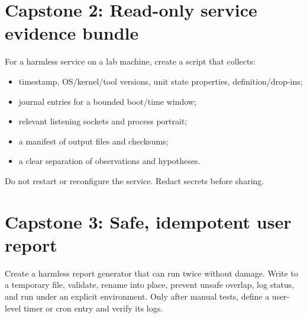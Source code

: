 \documentclass[11pt,oneside,openany]{book}
\begin{document}
\section{Capstone 2: Read-only service evidence bundle}
For a harmless service on a lab machine, create a script that collects:
\begin{itemize}
  \item timestamp, OS/kernel/tool versions, unit state properties, definition/drop-ins;
  \item journal entries for a bounded boot/time window;
  \item relevant listening sockets and process portrait;
  \item a manifest of output files and checksums;
  \item a clear separation of observations and hypotheses.
\end{itemize}
Do not restart or reconfigure the service. Redact secrets before sharing.

\section{Capstone 3: Safe, idempotent user report}
Create a harmless report generator that can run twice without damage. Write to a temporary file, validate, rename into place, prevent unsafe overlap, log status, and run under an explicit environment. Only after manual tests, define a user-level timer or cron entry and verify its logs.
\end{document}
